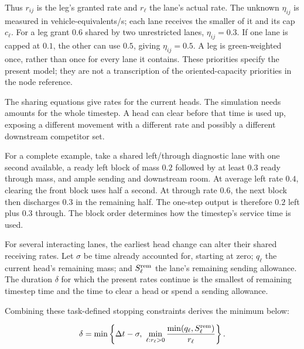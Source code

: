 \documentclass[10pt,a4paper]{article}
\newcommand{\rev}[1]{{\color{revisionred}#1}}
\begin{document}
Thus $r_{ij}$ is the leg's granted rate and $r_\ell$ the lane's actual
rate. The unknown $\eta_{ij}$ is measured in vehicle-equivalents/s; each
lane receives the smaller of it and its cap $c_\ell$. For a leg grant
$0.6$ shared by two unrestricted lanes, $\eta_{ij}=0.3$. If one lane is
capped at $0.1$, the other can use $0.5$, giving $\eta_{ij}=0.5$.
A leg is green-weighted once, rather than once for every lane it contains.
These priorities specify the present model; they are not a transcription
of the oriented-capacity priorities in the node reference.

The sharing equations give rates for the current heads. The simulation
needs amounts for the whole timestep. A head can clear before that time
is used up, exposing a different movement with a different rate and
possibly a different downstream competitor set.

For a complete example, take a shared left/through diagnostic lane with
one second available, a ready left block of mass $0.2$ followed by at
least $0.3$ ready through mass, and ample sending and downstream room.
At average left rate $0.4$, clearing the front block uses half a second.
At through rate $0.6$, the next block then discharges $0.3$ in the remaining
half. The one-step output is therefore $0.2$ left plus $0.3$ through.
The block order determines how the timestep's service time is used.

For several interacting lanes, the earliest head change can alter their
shared receiving rates. Let $\sigma$ be time already accounted for, starting
at zero; $q_\ell$ the current head's remaining mass; and
$S_\ell^{\rm rem}$ the lane's remaining sending allowance. The duration
$\delta$ for which the present rates continue is the smallest of remaining
timestep time and the time to clear a head or spend a sending allowance.
\par\begin{samepage}
\rev{Combining these task-defined stopping constraints derives the minimum below:}
\par
\begin{equation}
 \delta=\min\left\{\Delta t-\sigma,\
 \min_{\ell:r_\ell>0}
       \frac{\min(q_\ell,S_\ell^{\rm rem})}{r_\ell}\right\}.
 \label{eq:compact-head-time}
\end{equation}
\par\end{samepage}
\end{document}
